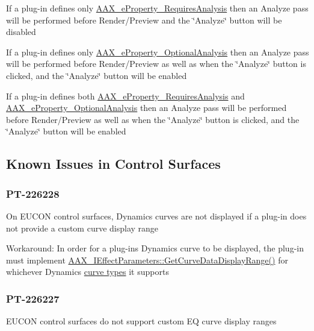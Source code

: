 \begin{DoxyItemize}
\item If a plug-\/in defines only \hyperlink{a00283_a6571f4e41a5dd06e4067249228e2249ea925c49bb79454b33bf1d5f4cb09d373f}{A\+A\+X\+\_\+e\+Property\+\_\+\+Requires\+Analysis} then an Analyze pass will be performed before Render/\+Preview and the \char`\"{}\+Analyze\char`\"{} button will be disabled \item If a plug-\/in defines only \hyperlink{a00283_a6571f4e41a5dd06e4067249228e2249ea5a2bacb421fc36f890a121f01a9e72ba}{A\+A\+X\+\_\+e\+Property\+\_\+\+Optional\+Analysis} then an Analyze pass will be performed before Render/\+Preview as well as when the \char`\"{}\+Analyze\char`\"{} button is clicked, and the \char`\"{}\+Analyze\char`\"{} button will be enabled \item If a plug-\/in defines both \hyperlink{a00283_a6571f4e41a5dd06e4067249228e2249ea925c49bb79454b33bf1d5f4cb09d373f}{A\+A\+X\+\_\+e\+Property\+\_\+\+Requires\+Analysis} and \hyperlink{a00283_a6571f4e41a5dd06e4067249228e2249ea5a2bacb421fc36f890a121f01a9e72ba}{A\+A\+X\+\_\+e\+Property\+\_\+\+Optional\+Analysis} then an Analyze pass will be performed before Render/\+Preview as well as when the \char`\"{}\+Analyze\char`\"{} button is clicked, and the \char`\"{}\+Analyze\char`\"{} button will be enabled\end{DoxyItemize}
\hypertarget{a00374_knownissues_cs}{}\subsection{Known Issues in Control Surfaces}\label{a00374_knownissues_cs}
\hypertarget{a00374_PT-226228}{}\subsubsection{P\+T-\/226228}\label{a00374_PT-226228}
On E\+U\+C\+O\+N control surfaces, Dynamics curves are not displayed if a plug-\/in does not provide a custom curve display range

Workaround\+: In order for a plug-\/in\textquotesingle{}s Dynamics curve to be displayed, the plug-\/in must implement \hyperlink{a00342_ga38d1ac0c15a7052904077ef0e2527e0d}{A\+A\+X\+\_\+\+I\+Effect\+Parameters\+::\+Get\+Curve\+Data\+Display\+Range()} for whichever Dynamics \hyperlink{a00342_ga59c73d8f51c5c55d54a728eff39da884}{curve types} it supports\hypertarget{a00374_PT-226227}{}\subsubsection{P\+T-\/226227}\label{a00374_PT-226227}
E\+U\+C\+O\+N control surfaces do not support custom E\+Q curve display ranges

